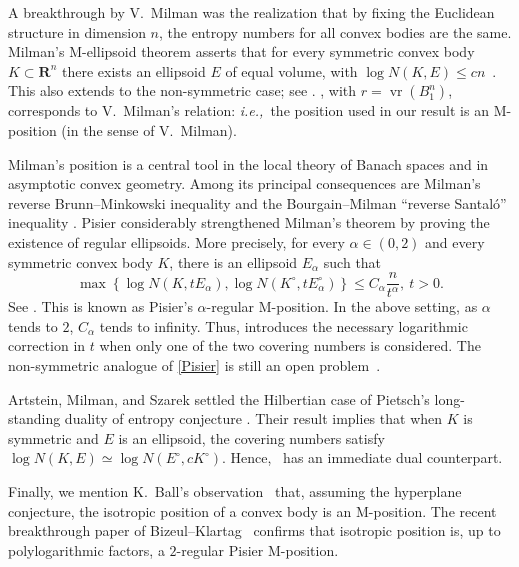 \documentclass[11pt]{amsart}
\newcommand{\R}{\mathbf R}
\newcommand{\vrad}{\operatorname{vr}}
\let\vr\vrad
\newcommand{\1}{\mathbf 1}
\newcommand{\ie}{\emph{i.e.,}}
\theoremstyle{plain}
\begin{document}
A breakthrough by V.\ Milman \cite{Mil86} was the realization that by fixing the Euclidean structure in dimension $n$, the entropy numbers for all convex bodies are the same. Milman's M-ellipsoid theorem asserts that for every symmetric convex body $K\subset \R^n$ there exists an ellipsoid $E$ of equal volume, with $\log{N(K, E)} \leq c n$~\cite{Mil86}. This also extends to the non-symmetric case; see \cite{MilPaj00}. , with $r= \vr(B_{1}^{n})$, corresponds to V.\ Milman's relation: \ie~the position used in our result is an M-position (in the sense of V.\ Milman).

Milman's position is a central tool in the local theory of Banach spaces and in asymptotic convex geometry. Among its principal consequences are Milman's reverse Brunn--Minkowski inequality and the Bourgain--Milman ``reverse Santal\'o'' inequality \cite{BouMil87}. Pisier considerably strengthened Milman's theorem by proving the existence of regular ellipsoids. More precisely, for every $\alpha \in (0, 2)$ and every symmetric convex body $K$, there is an ellipsoid $E_\alpha$ such that
\begin{equation}
\label{Pisier}
 \max\left\{ \log{N (K, t E_{\alpha}) },\log{ N( K^{\circ}, t E_{\alpha}^\circ )}\right\} \leq C_{\alpha} \frac{n}{ t^{\alpha}} , \ t >0.
 \end{equation}
See \cite[Chapter 7, Theorem 7.13]{Pis89}. This is known as Pisier's $\alpha$-regular M-position. In the above setting, as $\alpha$ tends to $2$, $C_{\alpha}$ tends to infinity. Thus,  introduces the necessary logarithmic correction in $t$ when only one of the two covering numbers is considered. The non-symmetric analogue of \eqref{Pisier} is still an open problem~\cite{Vri24,BizKla26}.

 Artstein, Milman, and Szarek settled the Hilbertian case of Pietsch's long-standing duality of entropy conjecture \cite[Theorem 1]{ArtMilSza04}. Their result implies that when $K$ is symmetric and $E$ is an ellipsoid, the covering numbers satisfy $\log{N(K,E)} \simeq \log{N(E^{\circ},cK^{\circ})}$. Hence,~ has an immediate dual counterpart.
 
 Finally, we mention K.\ Ball's observation~\cite{PHDBall} that, assuming the hyperplane conjecture, the isotropic position of a convex body is an M-position. The recent breakthrough paper of Bizeul--Klartag~\cite{BizKla26} confirms that isotropic position is, up to polylogarithmic factors, a $2$-regular Pisier M-position.
 
\end{document}
